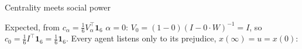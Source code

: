 \documentclass[10pt, aspectratio=169]{beamer}
\begin{document}
\begin{frame}[label=m-lemma,t]{Centrality meets social power}
{  \smallskip
%
  \begin{alertblock}{Expected, from $c_\alpha = \frac16 V_\alpha^\top \mathbf{1}_6$}
    \footnotesize
    $\alpha = 0$: $V_0 = (1-0)(I - 0 \cdot W)^{-1} = I$, so $c_0 = \frac16 I^\top \mathbf{1}_6 =
    \frac16 \mathbf{1}_6$. Every agent listens only to its prejudice, $x(\infty) = u = x(0)$:

\end{alertblock}}
\end{frame}
\end{document}
